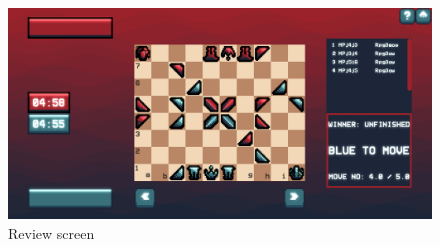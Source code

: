 \documentclass[../main/main.tex]{subfiles}
\begin{document}
\begin{figure}[H]
    \centering
    \includegraphics[width=\columnwidth]{../evaluation/assets/review.png}
    \caption{Review screen}
    \label{fig:evaluation-review}
\end{figure}
\end{document}
